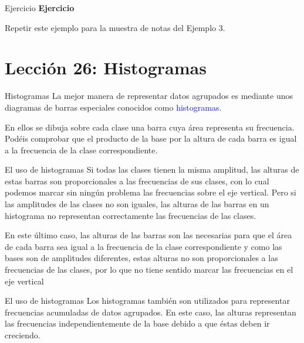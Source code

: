 \documentclass[
  ignorenonframetext,
  aspectratio=169]{beamer}
\newcommand\blue[1]{\textcolor{blue}{#1}}
\begin{document}
\begin{frame}{Ejercicio}
\label{ejercicio-1}
\textbf{Ejercicio}

Repetir este ejemplo para la muestra de notas del Ejemplo 3.
\end{frame}

\section{Lección 26: Histogramas}\label{lecciuxf3n-26-histogramas}

\begin{frame}{Histogramas}
\label{histogramas}
La mejor manera de representar datos agrupados es mediante unos
diagramas de barras especiales conocidos como \blue{histogramas}.

En ellos se dibuja sobre cada clase una barra cuya área representa su
frecuencia. Podéis comprobar que el producto de la base por la altura de
cada barra es igual a la frecuencia de la clase correspondiente.
\end{frame}

\begin{frame}{El uso de histogramas}
\label{el-uso-de-histogramas}
Si todas las clases tienen la misma amplitud, las alturas de estas
barras son proporcionales a las frecuencias de sus clases, con lo cual
podemos marcar sin ningún problema las frecuencias sobre el eje
vertical. Pero si las amplitudes de las clases no son iguales, las
alturas de las barras en un histograma no representan correctamente las
frecuencias de las clases.

En este último caso, las alturas de las barras son las necesarias para
que el área de cada barra sea igual a la frecuencia de la clase
correspondiente y como las bases son de amplitudes diferentes, estas
alturas no son proporcionales a las frecuencias de las clases, por lo
que no tiene sentido marcar las frecuencias en el eje vertical
\end{frame}

\begin{frame}{El uso de histogramas}
\label{el-uso-de-histogramas-1}
Los histogramas también son utilizados para representar frecuencias
acumuladas de datos agrupados. En este caso, las alturas representan las
frecuencias independientemente de la base debido a que éstas deben ir
creciendo.
\end{frame}
\end{document}
